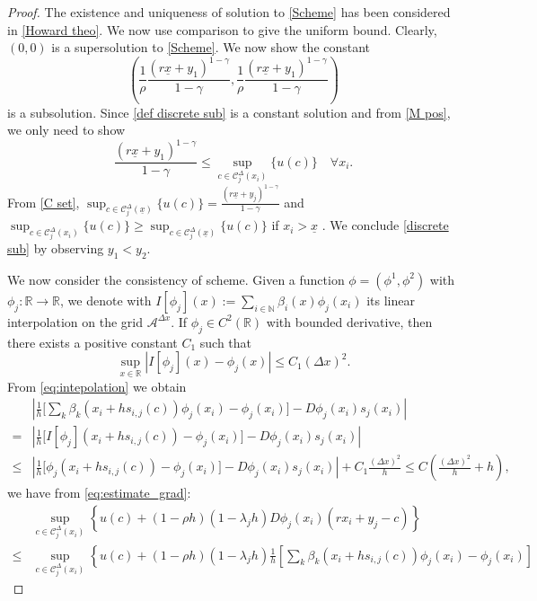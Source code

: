 \documentclass[10pt,a4paper]{amsart}
\newcommand{\Dx}{{\Delta x}}
\newcommand{\D}{\Delta}
\newcommand{\N}{\mathbb{N}}
\newcommand{\R}{\mathbb{R}}
\newcommand{\beq}{\begin{equation}}
\newcommand{\eeq}{\end{equation}}
\newcommand{\mA}{\mathcal A}
\newcommand{\mC}{\mathcal C}
\newcommand{\ux}{{\underline x}}
\begin{document}
\begin{proof}
The existence and uniqueness of solution to \cref{Scheme} has been considered in \cref{Howard theo}. We now use comparison to give the uniform bound. Clearly, $(0,0)$ is a supersolution to \cref{Scheme}. We now show the constant
\beq\label{def discrete sub}
\left(\frac{1}{\rho}\frac{(r\ux+y_1)^{1-\gamma}}{1-\gamma},\frac{1}{\rho}\frac{(r\ux+y_1)^{1-\gamma}}{1-\gamma}\right)
\eeq
 is a subsolution. Since \cref{def discrete sub} is a constant solution and from \cref{M pos}, we only need to show
\beq\label{discrete sub}
\frac{(r\ux+y_1)^{1-\gamma}}{1-\gamma}\leq \sup_{c\in \mC^{\D}_{j}(x_i)}\{u(c)\}\quad \forall x_i.
\eeq
From \cref{C set}, $\sup_{c\in \mC^{\D}_{j}(\ux)}\{u(c)\}=\frac{(r\ux+y_j)^{1-\gamma}}{1-\gamma}$ and $\sup_{c\in \mC^{\D}_{j}(x_i)}\{u(c)\}\geq \sup_{c\in \mC^{\D}_{j}(\ux)}\{u(c)\}$ if $x_i>\ux$ . We conclude \cref{discrete sub} by observing $y_1<y_2$.  \par
We now consider the consistency of scheme.  Given a  function $\phi=(\phi^1,\phi^2)$ with $\phi_{j}:\R\to\R$, we denote with 
$
	I[\phi_{j}](x):=\sum_{i\in  \N} \beta_i(x) \phi_{j} (x_i) 
$
its linear interpolation on the grid $\mA^\Dx$. If $\phi_{j}\in C^2(\R)$ with bounded derivative, then there exists a positive constant $C_1$ such that
\begin{equation}\label{eq:intepolation} 
	\sup_{x\in \R}| I[ \phi_{j}](x)-\phi_{j}(x)|\le C_1(\Dx)^2.
\end{equation} 
From \eqref{eq:intepolation} we obtain
\begin{equation}\label{eq:estimate_grad}
	\begin{split}
		& \left|\frac{1}{h} \big[ \sum_k \beta_k(x_i+hs_{i,j}(c))\phi_{j}(x_i)-\phi_{j}(x_i)]-D\phi_{j}(x_i)s_j(x_i)\right|\\
		=& \left|\frac{1}{h} \big[I[ \phi_{j}](x_i+hs_{i,j}(c))-\phi_{j}(x_i)\big]-D\phi_{j}(x_i)s_j(x_i)\right| \\
\le &\left|\frac{1}{h}  \big[\phi_{j}(x_i+hs_{i,j}(c))-\phi_{j}(x_i)\big]-D\phi_{j}(x_i)s_j(x_i)\right| +	C_1\frac{(\Dx)^2}{h}
\le C\left(\frac{(\Dx)^2}{h}+h\right),
	\end{split}
\end{equation}
we have from \cref{eq:estimate_grad}:
\begin{align*}
&\sup_{c\in \mC^{\D}_{j}(x_i)}\left\{
	u(c)+(1-\rho h)(1-\lambda_jh)D\phi_{j}(x_i)(rx_i+y_j-c)
	\right\}\\
\leq {}&\sup_{c\in \mC^{\D}_{j}(x_i)}\left\{
	u(c)+(1-\rho h)(1-\lambda_jh)\frac{1}{h} \left[ \sum_k \beta_k\left(x_i+hs_{i,j}(c)\right)\phi_{j}(x_i)-\phi_{j}(x_i)\right] 

\end{align*}
\end{proof}
\end{document}
